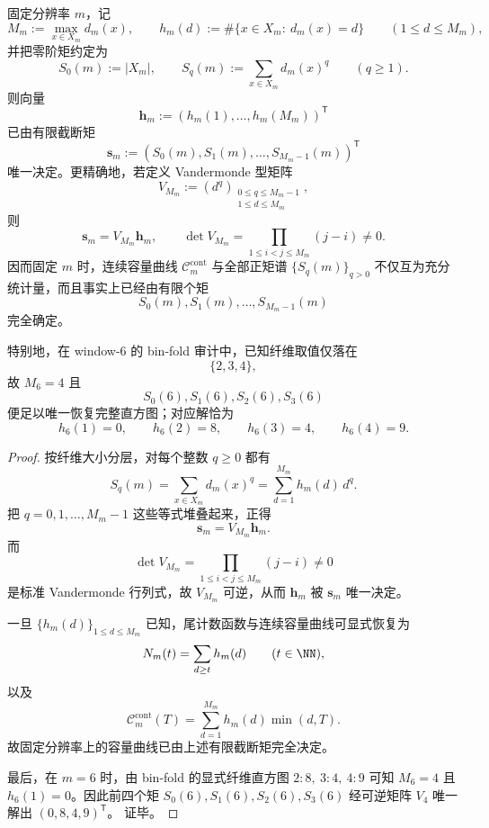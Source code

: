 \begin{theorem}[有限支撑纤维谱的截断矩完全可逆性]\label{thm:fold-fiber-truncated-moment-complete-inversion}
固定分辨率 \(m\)，记
\[
M_m:=\max_{x\in X_m}d_m(x),
\qquad
h_m(d):=\#\{x\in X_m:\ d_m(x)=d\}
\qquad(1\le d\le M_m),
\]
并把零阶矩约定为
\[
S_0(m):=|X_m|,
\qquad
S_q(m):=\sum_{x\in X_m}d_m(x)^q
\qquad(q\ge 1).
\]
则向量
\[
\mathbf h_m:=(h_m(1),\dots,h_m(M_m))^{\mathsf T}
\]
已由有限截断矩
\[
\mathbf s_m:=(S_0(m),S_1(m),\dots,S_{M_m-1}(m))^{\mathsf T}
\]
唯一决定。更精确地，若定义 Vandermonde 型矩阵
\[
V_{M_m}:=(d^q)_{\substack{0\le q\le M_m-1\\ 1\le d\le M_m}},
\]
则
\[
\mathbf s_m=V_{M_m}\mathbf h_m,
\qquad
\det V_{M_m}=\prod_{1\le i<j\le M_m}(j-i)\neq 0.
\]
因而固定 \(m\) 时，连续容量曲线 \(\mathcal C_m^{\mathrm{cont}}\) 与全部正矩谱 \(\{S_q(m)\}_{q>0}\) 不仅互为充分统计量，而且事实上已经由有限个矩
\[
S_0(m),S_1(m),\dots,S_{M_m-1}(m)
\]
完全确定。

特别地，在 window-\(6\) 的 bin-fold 审计中，已知纤维取值仅落在
\[
\{2,3,4\},
\]
故 \(M_6=4\) 且
\[
S_0(6),S_1(6),S_2(6),S_3(6)
\]
便足以唯一恢复完整直方图；对应解恰为
\[
h_6(1)=0,\qquad h_6(2)=8,\qquad h_6(3)=4,\qquad h_6(4)=9.
\]
\end{theorem}
\begin{proof}
按纤维大小分层，对每个整数 \(q\ge 0\) 都有
\[
S_q(m)=\sum_{x\in X_m}d_m(x)^q=\sum_{d=1}^{M_m}h_m(d)\,d^q.
\]
把 \(q=0,1,\dots,M_m-1\) 这些等式堆叠起来，正得
\[
\mathbf s_m=V_{M_m}\mathbf h_m.
\]
而
\[
\det V_{M_m}=\prod_{1\le i<j\le M_m}(j-i)\neq 0
\]
是标准 Vandermonde 行列式，故 \(V_{M_m}\) 可逆，从而 \(\mathbf h_m\) 被 \(\mathbf s_m\) 唯一决定。

一旦 \(\{h_m(d)\}_{1\le d\le M_m}\) 已知，尾计数函数与连续容量曲线可显式恢复为
\[
N_m(t)=\sum_{d\ge t}h_m(d)
\qquad(t\in\NN),
\]
以及
\[
\mathcal C_m^{\mathrm{cont}}(T)=\sum_{d=1}^{M_m}h_m(d)\min(d,T).
\]
故固定分辨率上的容量曲线已由上述有限截断矩完全决定。

最后，在 \(m=6\) 时，由 bin-fold 的显式纤维直方图
\(
2:8,\ 3:4,\ 4:9
\)
可知 \(M_6=4\) 且 \(h_6(1)=0\)。因此前四个矩
\(
S_0(6),S_1(6),S_2(6),S_3(6)
\)
经可逆矩阵 \(V_4\) 唯一解出
\(
(0,8,4,9)^{\mathsf T}
\)。
证毕。
\end{proof}

